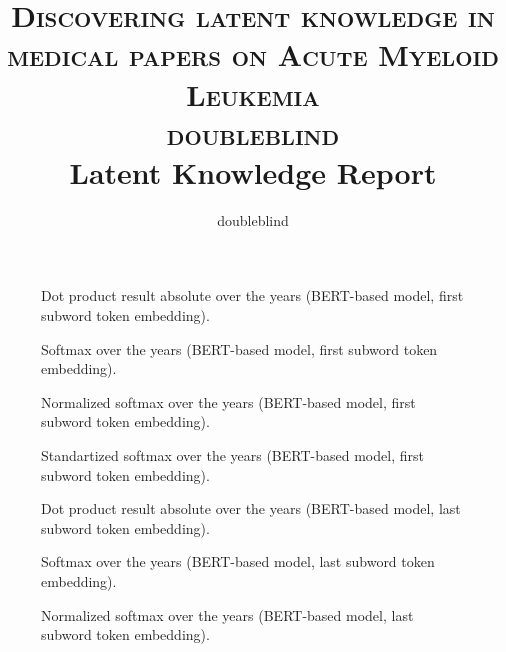 \documentclass[10pt,letterpaper]{article}
\title{
		\usefont{OT1}{bch}{b}{n}
		\normalfont \normalsize \textsc{Discovering latent knowledge in medical papers on Acute Myeloid Leukemia\\ doubleblind} \\ [10pt]
		\huge Latent Knowledge Report \\
}
\author[1]{doubleblind}
\affil[1]{\small{doubleblind}}
\begin{document}
\maketitle
{}

\thispagestyle{empty}
\listoffigures
\newpage

\begin{figure}[!ht]
    \centering
    \caption{Dot product result absolute over the years (BERT-based model, first subword token embedding).}
    \label{fig:dp_absolute_first_subword}
\end{figure}

\begin{figure}[!ht]
    \centering
    \caption{Softmax over the years (BERT-based model, first subword token embedding).}
    \label{fig:softmax_first_subword}
\end{figure}

\begin{figure}[!ht]
    \centering
    \caption{Normalized softmax over the years (BERT-based model, first subword token embedding).}
    \label{fig:softmax_normalization_first_subword}
\end{figure}

\begin{figure}[!ht]
    \centering
    \caption{Standartized softmax over the years (BERT-based model, first subword token embedding).}
    \label{fig:softmax_standartization_first_subword}
\end{figure}

\begin{figure}[!ht]
    \centering
    \caption{Dot product result absolute over the years (BERT-based model, last subword token embedding).}
    \label{fig:dp_absolute_last_subword}
\end{figure}

\begin{figure}[!ht]
    \centering
    \caption{Softmax over the years (BERT-based model, last subword token embedding).}
    \label{fig:softmax_last_subword}
\end{figure}

\begin{figure}[!ht]
    \centering
    \caption{Normalized softmax over the years (BERT-based model, last subword token embedding).}
    \label{fig:softmax_normalization_last_subword}
\end{figure}
\end{document}
